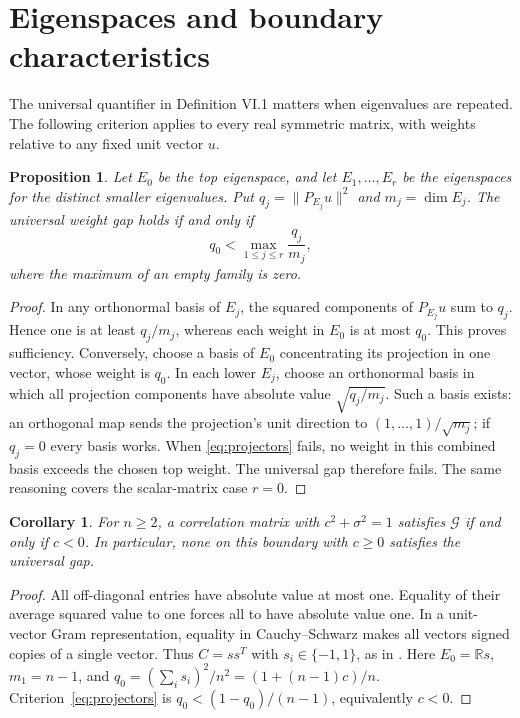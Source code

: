 \documentclass[11pt]{article}
\newtheorem{proposition}[theorem]{Proposition}
\newtheorem{corollary}[theorem]{Corollary}
\newcommand{\R}{\mathbb R}
\newcommand{\G}{\mathcal G}
\begin{document}
\section{Eigenspaces and boundary characteristics}
The universal quantifier in Definition VI.1 matters when eigenvalues
are repeated. The following criterion applies to every real symmetric
matrix, with weights relative to any fixed unit vector $u$.
\begin{proposition}\label{prop:projectors}
Let $E_0$ be the top eigenspace, and let $E_1,\ldots,E_r$ be the
eigenspaces for the distinct smaller eigenvalues. Put
$q_j=\|P_{E_j}u\|^2$ and $m_j=\dim E_j$.
The universal weight gap holds if and only if
\begin{equation}\label{eq:projectors}
 q_0<\max_{1\le j\le r}\frac{q_j}{m_j},
\end{equation}
where the maximum of an empty family is zero.
\end{proposition}
\begin{proof}
In any orthonormal basis of $E_j$, the squared components of
$P_{E_j}u$ sum to $q_j$. Hence one is at least $q_j/m_j$,
whereas each weight in $E_0$ is at most $q_0$. This proves
sufficiency. Conversely, choose a basis of $E_0$ concentrating its
projection in one vector, whose weight is $q_0$. In each lower
$E_j$, choose an orthonormal basis in which all projection
components have absolute value $\sqrt{q_j/m_j}$. Such a basis
exists: an orthogonal map sends the projection's unit direction to
$(1,\ldots,1)/\sqrt{m_j}$; if $q_j=0$ every basis works.
When \eqref{eq:projectors} fails, no weight in this combined basis
exceeds the chosen top weight. The universal gap therefore fails.
The same reasoning covers the scalar-matrix case $r=0$.
\end{proof}

\begin{corollary}\label{cor:circle}
For $n\ge2$, a correlation matrix with $c^2+\sigma^2=1$ satisfies
$\G$ if and only if $c<0$. In particular, none on this boundary
with $c\ge0$ satisfies the universal gap.
\end{corollary}
\begin{proof}
All off-diagonal entries have absolute value at most one. Equality of
their average squared value to one forces all to have absolute value
one. In a unit-vector Gram representation, equality in
Cauchy--Schwarz makes all vectors signed copies of a single vector.
Thus $C=ss^T$ with $s_i\in\{-1,1\}$, as in
\cite[Lemma VI.11 and Example II.4]{SHG}.
Here $E_0=\R s$, $m_1=n-1$, and
$q_0=(\sum_i s_i)^2/n^2=(1+(n-1)c)/n$.
Criterion~\eqref{eq:projectors} is $q_0<(1-q_0)/(n-1)$,
equivalently $c<0$.
\end{proof}
\end{document}
